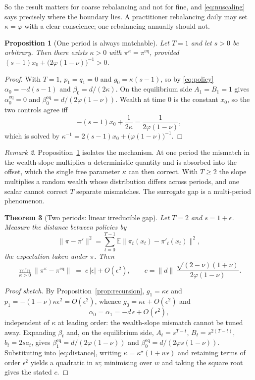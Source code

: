 \documentclass[11pt,a4paper]{article}
\theoremstyle{plain}
\newtheorem{theorem}{Theorem}
\newtheorem{proposition}[theorem]{Proposition}
\theoremstyle{definition}
\theoremstyle{remark}
\newtheorem{remark}[theorem]{Remark}
\newcommand{\E}{\mathbb{E}}
\newcommand{\pieq}{\pi^{\mathrm{eq}}}
\newcommand{\pir}{\pi^{\kappa}}
\begin{document}
\noindent
So the result matters for coarse rebalancing and not for fine, and
\eqref{eq:nuscaling} says precisely where the boundary lies. A practitioner
rebalancing daily may set $\kappa=\varphi$ with a clear conscience; one
rebalancing annually should not.

\begin{proposition}[One period is always matchable]\label{prop:t1}
Let $T=1$ and let $s>0$ be arbitrary. Then there exists $\kappa>0$ with
$\pir=\pieq$, provided $(s-1)x_0+\bigl(2\varphi(1-\nu)\bigr)^{-1}>0$.
\end{proposition}

\begin{proof}
With $T=1$, $p_1=q_1=0$ and $g_0=\kappa(s-1)$, so by \eqref{eq:policy}
$\alpha_0=-d(s-1)$ and $\beta_0=d/(2\kappa)$. On the equilibrium side
$A_1=B_1=1$ gives $\alpha^{\mathrm{eq}}_0=0$ and
$\beta^{\mathrm{eq}}_0=d/(2\varphi(1-\nu))$. Wealth at time $0$ is the constant
$x_0$, so the two controls agree iff
\[
-(s-1)x_0+\frac{1}{2\kappa}=\frac{1}{2\varphi(1-\nu)},
\]
which is solved by $\kappa^{-1}=2(s-1)x_0+\bigl(\varphi(1-\nu)\bigr)^{-1}$.
\end{proof}

\begin{remark}
Proposition~\ref{prop:t1} isolates the mechanism. At one period the mismatch in
the wealth-slope multiplies a deterministic quantity and is absorbed into the
offset, which the single free parameter $\kappa$ can then correct. With $T\ge2$
the slope multiplies a random wealth whose distribution differs across periods,
and one scalar cannot correct $T$ separate mismatches. The surrogate gap is a
multi-period phenomenon.
\end{remark}

\begin{theorem}[Two periods: linear irreducible gap]\label{thm:t2}
Let $T=2$ and $s=1+\epsilon$. Measure the distance between policies by
\begin{equation}
\|\pi-\pi'\|^{2}=\sum_{t=0}^{T-1}\E\bigl\|\pi_t(x_t)-\pi'_t(x_t)\bigr\|^{2},
\label{eq:distance}
\end{equation}
the expectation taken under $\pi$. Then
\[
\min_{\kappa>0}\bigl\|\pir-\pieq\bigr\|
\;=\;c\,|\epsilon|+O(\epsilon^{2}),
\qquad
c=\|d\|\,\frac{\sqrt{(2-\nu)(1+\nu)}}{2\varphi(1-\nu)} .
\]
\end{theorem}

\begin{proof}[Proof sketch]
By Proposition~\ref{prop:recursion}, $g_1=\kappa\epsilon$ and
$p_1=-(1-\nu)\kappa\epsilon^{2}=O(\epsilon^{2})$, whence
$g_0=\kappa\epsilon+O(\epsilon^{2})$ and
\[
\alpha_0=\alpha_1=-d\,\epsilon+O(\epsilon^{2}),
\]
independent of $\kappa$ at leading order: the wealth-slope mismatch cannot be
tuned away. Expanding $\beta_t$ and, on the equilibrium side,
$A_t=s^{T-t}$, $B_t=s^{2(T-t)}$, $b_t=2sa_t$, gives
$\beta^{\mathrm{eq}}_1=d/(2\varphi(1-\nu))$ and
$\beta^{\mathrm{eq}}_0=d/(2\varphi s(1-\nu))$. Substituting into
\eqref{eq:distance}, writing $\kappa=\kappa^{\star}(1+w\epsilon)$ and retaining
terms of order $\epsilon^{2}$ yields a quadratic in $w$; minimising over $w$ and
taking the square root gives the stated $c$.
\end{proof}
\end{document}
